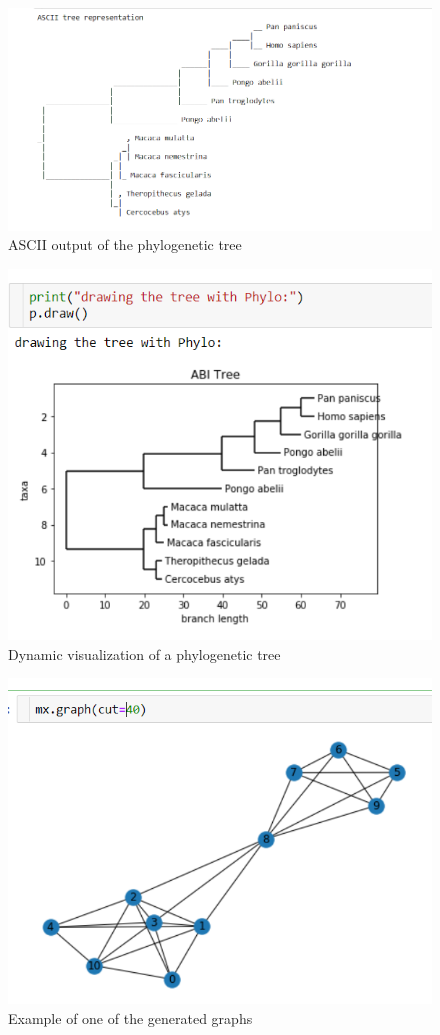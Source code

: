 \documentclass[11pt]{article}
\begin{document}
\begin{figure}[h!]
    \centering
    \includegraphics{tree_ascii.png}
    \caption{ASCII output of the phylogenetic tree}
\end{figure}

\begin{figure}[h!]
    \centering
    \includegraphics{image_tree.png}
    \caption{Dynamic visualization of a phylogenetic tree}
\end{figure}

\begin{figure}[h!]
    \centering
    \includegraphics{graph.png}
    \caption{Example of one of the generated graphs}
    \label{fig:my_label}
\end{figure}
\end{document}
